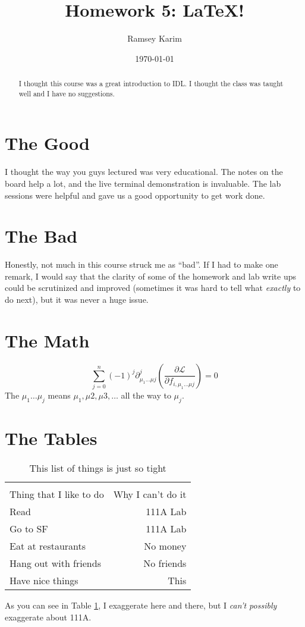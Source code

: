 \documentclass[12pt]{article}
\title{Homework 5: \LaTeX{}!}
\author{Ramsey Karim}
\date{\today}
\newcommand{\Lagr}{\mathcal{L}}
\begin{document}
\maketitle

\begin{abstract}
I thought this course was a great introduction to IDL.
I thought the class was taught well and I have no suggestions.
\end{abstract}

\section{The Good}
I thought the way you guys lectured was very educational.
The notes on the board help a lot, and the live terminal demonstration
is invaluable.
The lab sessions were helpful and gave us a good opportunity to get work done.

\section{The Bad}
Honestly, not much in this course struck me as ``bad''.
If I had to make one remark, I would say that the clarity of some of the
homework and lab write ups could be scrutinized and improved (sometimes
it was hard to tell what \textit{exactly} to do next), but it was never
a huge issue.

\section{The Math}
$$ \sum^{n}_{j=0} (-1)^{j} \partial^{j}_{\mu_{1} \dots \mu{j}} \left( \frac{\partial \Lagr}{\partial f_{i,\mu_{1} \dots \mu{j}}} \right) = 0$$
The $\mu_{1} \dots \mu_{j}$ means $\mu_{1}, \mu{2}, \mu{3}, \dots$
all the way to $\mu_{j}$.

\section{The Tables}

\begin{table}
\centering
\begin{tabular}{||l|r|}
\hline \\
Thing that I like to do & Why I can't do it \\\hline
Read & 111A Lab \\
Go to SF & 111A Lab \\
Eat at restaurants & No money \\
Hang out with friends & No friends \\
Have nice things & This \\\hline
\end{tabular}
\caption{\label{tab:t1}This list of things is just so tight}
\end{table}
As you can see in Table \ref{tab:t1}, I exaggerate here and there,
but I \textit{can't possibly} exaggerate about 111A.
\end{document}
